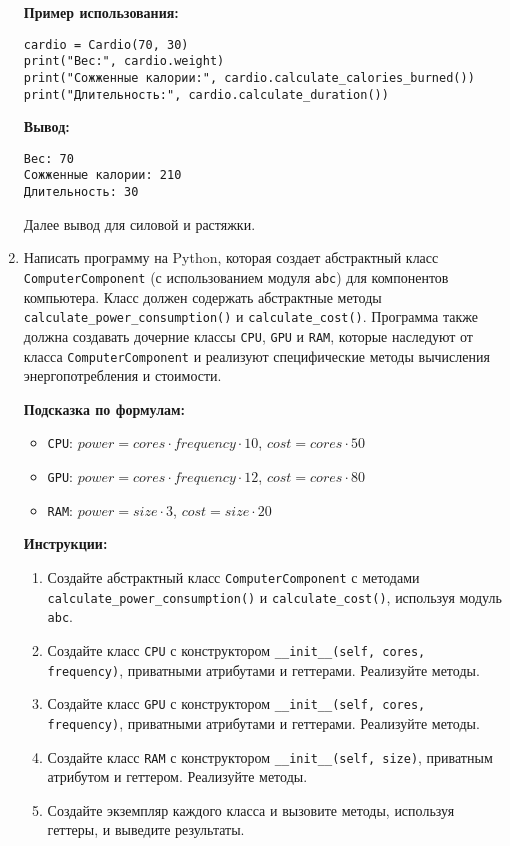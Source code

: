 \begin{enumerate}
\textbf{Пример использования:}
\begin{verbatim}
cardio = Cardio(70, 30)
print("Вес:", cardio.weight)
print("Сожженные калории:", cardio.calculate_calories_burned())
print("Длительность:", cardio.calculate_duration())
\end{verbatim}

\textbf{Вывод:}
\begin{verbatim}
Вес: 70
Сожженные калории: 210
Длительность: 30
\end{verbatim}

Далее вывод для силовой и растяжки.

\item
Написать программу на Python, которая создает абстрактный класс \texttt{ComputerComponent} (с использованием модуля \texttt{abc}) для компонентов компьютера. 
Класс должен содержать абстрактные методы \texttt{calculate\_power\_consumption()} и \texttt{calculate\_cost()}. 
Программа также должна создавать дочерние классы \texttt{CPU}, \texttt{GPU} и \texttt{RAM}, 
которые наследуют от класса \texttt{ComputerComponent} и реализуют специфические методы вычисления энергопотребления и стоимости.

\textbf{Подсказка по формулам:}
\begin{itemize}
    \item \texttt{CPU}: $power = cores \cdot frequency \cdot 10$, $cost = cores \cdot 50$
    \item \texttt{GPU}: $power = cores \cdot frequency \cdot 12$, $cost = cores \cdot 80$
    \item \texttt{RAM}: $power = size \cdot 3$, $cost = size \cdot 20$
\end{itemize}

\textbf{Инструкции:}
\begin{enumerate}
    \item Создайте абстрактный класс \texttt{ComputerComponent} с методами \texttt{calculate\_power\_consumption()} и \texttt{calculate\_cost()}, используя модуль \texttt{abc}.
    \item Создайте класс \texttt{CPU} с конструктором \texttt{\_\_init\_\_(self, cores, frequency)}, приватными атрибутами и геттерами. Реализуйте методы.
    \item Создайте класс \texttt{GPU} с конструктором \texttt{\_\_init\_\_(self, cores, frequency)}, приватными атрибутами и геттерами. Реализуйте методы.
    \item Создайте класс \texttt{RAM} с конструктором \texttt{\_\_init\_\_(self, size)}, приватным атрибутом и геттером. Реализуйте методы.
    \item Создайте экземпляр каждого класса и вызовите методы, используя геттеры, и выведите результаты.
\end{enumerate}


\end{enumerate}

